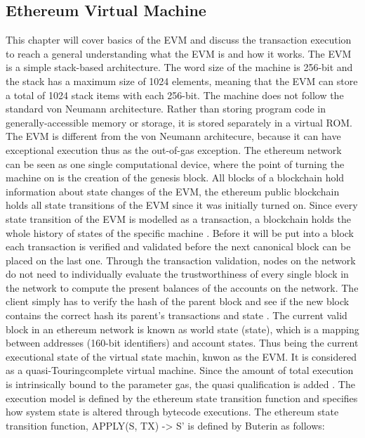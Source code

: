 \subsection{Ethereum Virtual Machine}
\label{subsec:background:first_section:ethereum}
This chapter will cover basics of the \ac{EVM} and discuss the transaction execution to reach a general understanding what the \ac{EVM} is and how it works. The \ac{EVM} is a simple stack-based architecture. The word size of the machine is 256-bit and the stack has a maximum size of 1024 elements, meaning that the \ac{EVM} can store a total of 1024 stack items with each 256-bit. The machine does not follow the standard von Neumann architecture. Rather than storing program code in generally-accessible memory or storage, it is stored separately in a virtual ROM. The \ac{EVM} is different from the von Neumann architecure, because it can have exceptional execution thus as the out-of-gas exception. \cite{wood2014ethereum} The ethereum network can be seen as one single computational device, where the point of turning the machine on is the creation of the genesis block. All blocks of a blockchain hold information about state changes of the \ac{EVM}, the ethereum public blockchain holds all state transitions of the \ac{EVM} since it was initially turned on. Since every state transition of the \ac{EVM} is modelled as a transaction, a blockchain holds the whole history of states of the specific machine \cite{dannen2017introducing}. Before it will be put into a block each transaction is verified and validated before the next canonical block can be placed on the last one. Through the transaction validation, nodes on the network do not need to individually evaluate the trustworthiness of every single block in the network to compute the present balances of the accounts on the network. The client simply has to verify the hash of the parent block and see if the new block contains the correct hash its parent’s transactions and state \cite{dannen2017introducing}. The current valid block in an ethereum network is known as world state (state), which is a mapping between addresses (160-bit identifiers) and account states. Thus being the current executional state of the virtual state machin, knwon as the \ac{EVM}. It is considered as a quasi-Touringcomplete virtual machine. Since the amount of total execution is intrinsically bound to the parameter gas, the quasi  qualification is added \cite{wood2014ethereum}. The execution model is defined by the ethereum state transition function and specifies how system state is altered through bytecode executions. \newline \newline
The ethereum state transition function, APPLY(S, TX) -> S' is defined by Buterin \cite{buterin2013ethereum}  as follows:

